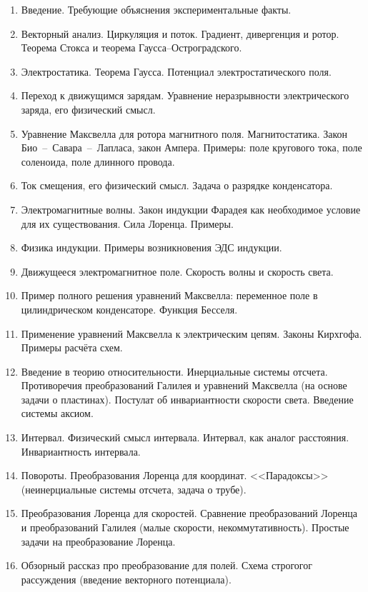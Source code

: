 \documentclass[11pt]{article}
\begin{document}
\begin{enumerate}
\item Введение. Требующие объяснения экспериментальные факты.
\item Векторный анализ. Циркуляция и поток. Градиент, дивергенция и
  ротор. Теорема Стокса и теорема Гаусса--Остроградского.
\item Электростатика. Теорема Гаусса. Потенциал электростатического
  поля.
\item Переход к движущимся зарядам. Уравнение неразрывности
  электрического заряда, его физический смысл.
\item Уравнение Максвелла для ротора магнитного
  поля. Магнитостатика. Закон Био~--~Савара~--~Лапласа, закон
  Ампера. Примеры: поле кругового тока, поле соленоида, поле длинного
  провода.
\item Ток смещения, его физический смысл. Задача о разрядке
  конденсатора.
\item Электромагнитные волны. Закон индукции Фарадея как необходимое
  условие для их существования. Сила Лоренца. Примеры.
\item Физика индукции. Примеры возникновения ЭДС индукции.
\item Движущееся электромагнитное поле. Скорость волны и скорость
  света.
\item Пример полного решения уравнений Максвелла: переменное поле в
  цилиндрическом конденсаторе. Функция Бесселя.
\item Применение уравнений Максвелла к электрическим цепям. Законы
  Кирхгофа. Примеры расчёта схем.
\item Введение в теорию относительности. Инерциальные системы
  отсчета. Противоречия преобразований Галилея и уравнений Максвелла
  (на основе задачи о пластинах). Постулат об инвариантности скорости
  света. Введение системы аксиом.
\item Интервал. Физический смысл интервала. Интервал, как аналог
  расстояния. Инвариантность интервала.
\item Повороты. Преобразования Лоренца для координат. <<Парадоксы>>
  (неинерциальные системы отсчета, задача о трубе).
\item Преобразования Лоренца для скоростей. Сравнение преобразований
  Лоренца и преобразований Галилея (малые скорости,
  некоммутативность). Простые задачи на преобразование Лоренца.
\item Обзорный рассказ про преобразование для полей. Схема
  строгогог рассуждения (введение векторного потенциала).
\end{enumerate}
\end{document}
